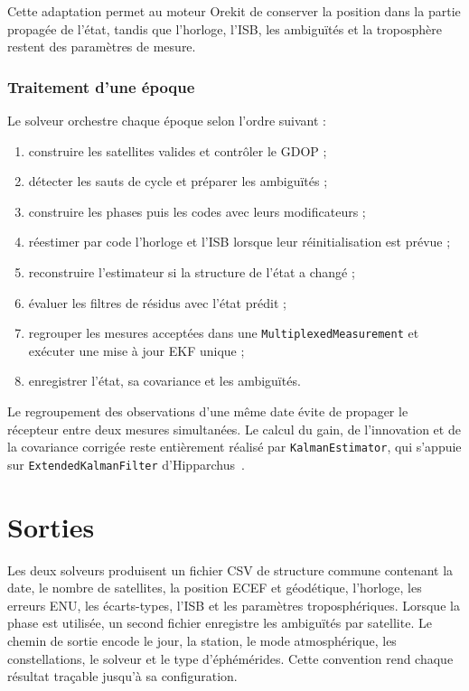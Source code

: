 Cette adaptation permet au moteur Orekit de conserver la position dans la
partie propagée de l'état, tandis que l'horloge, l'ISB, les ambiguïtés et la
troposphère restent des paramètres de mesure.

\subsubsection{Traitement d'une époque}

Le solveur orchestre chaque époque selon l'ordre suivant :

\begin{enumerate}
    \item construire les satellites valides et contrôler le GDOP ;
    \item détecter les sauts de cycle et préparer les ambiguïtés ;
    \item construire les phases puis les codes avec leurs modificateurs ;
    \item réestimer par code l'horloge et l'ISB lorsque leur réinitialisation
    est prévue ;
    \item reconstruire l'estimateur si la structure de l'état a changé ;
    \item évaluer les filtres de résidus avec l'état prédit ;
    \item regrouper les mesures acceptées dans une
    \texttt{MultiplexedMeasurement} et exécuter une mise à jour EKF unique ;
    \item enregistrer l'état, sa covariance et les ambiguïtés.
\end{enumerate}

Le regroupement des observations d'une même date évite de propager le
récepteur entre deux mesures simultanées. Le calcul du gain, de l'innovation
et de la covariance corrigée reste entièrement réalisé par
\texttt{KalmanEstimator}, qui s'appuie sur
\texttt{ExtendedKalmanFilter} d'Hipparchus~\cite{hipparchus403}.


\section{Sorties}
\label{sec:implementation_outputs}

Les deux solveurs produisent un fichier CSV de structure commune contenant la
date, le nombre de satellites, la position ECEF et géodétique, l'horloge, les
erreurs ENU, les écarts-types, l'ISB et les paramètres troposphériques. Lorsque
la phase est utilisée, un second fichier enregistre les ambiguïtés par
satellite. Le chemin de sortie encode le jour, la station, le mode
atmosphérique, les constellations, le solveur et le type d'éphémérides. Cette
convention rend chaque résultat traçable jusqu'à sa configuration.


